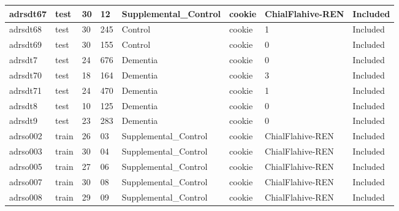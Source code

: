 \begin{center}
\begin{longtable}{|l|l|l|l|l|l|l|l|}
adrsdt67       & test                  & 30              & 12                 & Supplemental\_Control & cookie          & ChialFlahive-REN & Included      \\ \hline
adrsdt68       & test                  & 30              & 245                & Control              & cookie          & 1                & Included      \\ \hline
adrsdt69       & test                  & 30              & 155                & Control              & cookie          & 0                & Included      \\ \hline
adrsdt7        & test                  & 24              & 676                & Dementia             & cookie          & 0                & Included      \\ \hline
adrsdt70       & test                  & 18              & 164                & Dementia             & cookie          & 3                & Included      \\ \hline
adrsdt71       & test                  & 24              & 470                & Dementia             & cookie          & 1                & Included      \\ \hline
adrsdt8        & test                  & 10              & 125                & Dementia             & cookie          & 0                & Included      \\ \hline
adrsdt9        & test                  & 23              & 283                & Dementia             & cookie          & 0                & Included      \\ \hline
adrso002       & train                 & 26              & 03                 & Supplemental\_Control & cookie          & ChialFlahive-REN & Included      \\ \hline
adrso003       & train                 & 30              & 04                 & Supplemental\_Control & cookie          & ChialFlahive-REN & Included      \\ \hline
adrso005       & train                 & 27              & 06                 & Supplemental\_Control & cookie          & ChialFlahive-REN & Included      \\ \hline
adrso007       & train                 & 30              & 08                 & Supplemental\_Control & cookie          & ChialFlahive-REN & Included      \\ \hline
adrso008       & train                 & 29              & 09                 & Supplemental\_Control & cookie          & ChialFlahive-REN & Included      \\ \hline

\end{longtable}
\end{center}
